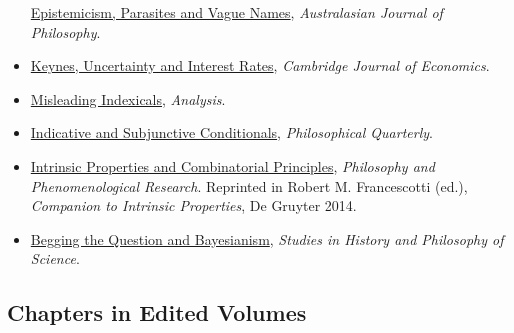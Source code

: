 \documentclass[
  10pt,
  letterpaper,
  DIV=11,
  numbers=noendperiod,
  twoside]{scrartcl}
\begin{document}
\begin{itemize}
  \href{https://brian.weatherson.org/quarto/posts/epvn/epistemicism-parasites-and-vague-names.html}{Epistemicism,
  Parasites and Vague Names}, \emph{Australasian Journal of Philosophy}.
\item
  \href{https://brian.weatherson.org/quarto/posts/kuir/keynes-uncertainty-and-interest-rates.html}{Keynes,
  Uncertainty and Interest Rates}, \emph{Cambridge Journal of
  Economics}.
\item
  \href{https://brian.weatherson.org/quarto/posts/misindex/misleading-indexicals.html}{Misleading
  Indexicals}, \emph{Analysis}.
\item
  \href{https://brian.weatherson.org/quarto/posts/indsub/indicative-and-subjunctive-conditionals.html}{Indicative
  and Subjunctive Conditionals}, \emph{Philosophical Quarterly}.
\item
  \href{https://brian.weatherson.org/quarto/posts/ipacp/intrinsic-properties-and-combinatorial-principles.html}{Intrinsic
  Properties and Combinatorial Principles}, \emph{Philosophy and
  Phenomenological Research}. Reprinted in Robert M. Francescotti (ed.),
  \emph{Companion to Intrinsic Properties}, De Gruyter 2014.
\item
  \href{https://brian.weatherson.org/quarto/posts/bqb/begging-the-question-and-bayesians.html}{Begging
  the Question and Bayesianism}, \emph{Studies in History and Philosophy
  of Science}.
\end{itemize}

\subsection{Chapters in Edited
Volumes}\label{chapters-in-edited-volumes}
\end{document}
